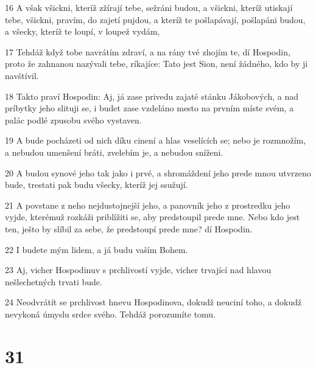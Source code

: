 \par 16 A však všickni, kteríž zžírají tebe, sežráni budou, a všickni, kteríž utiskají tebe, všickni, pravím, do zajetí pujdou, a kteríž te pošlapávají, pošlapáni budou, a všecky, kteríž te loupí, v loupež vydám,
\par 17 Tehdáž když tobe navrátím zdraví, a na rány tvé zhojím te, dí Hospodin, proto že zahnanou nazývali tebe, ríkajíce: Tato jest Sion, není žádného, kdo by ji navštívil.
\par 18 Takto praví Hospodin: Aj, já zase privedu zajaté stánku Jákobových, a nad príbytky jeho slituji se, i budet zase vzdeláno mesto na prvním míste svém, a palác podlé zpusobu svého vystaven.
\par 19 A bude pocházeti od nich díku cinení a hlas veselících se; nebo je rozmnožím, a nebudou umenšení bráti, zvelebím je, a nebudou sníženi.
\par 20 A budou synové jeho tak jako i prvé, a shromáždení jeho prede mnou utvrzeno bude, trestati pak budu všecky, kteríž jej ssužují.
\par 21 A povstane z neho nejdustojnejší jeho, a panovník jeho z prostredku jeho vyjde, kterémuž rozkáži priblížiti se, aby predstoupil prede mne. Nebo kdo jest ten, ješto by slíbil za sebe, že predstoupí prede mne? dí Hospodin.
\par 22 I budete mým lidem, a já budu vaším Bohem.
\par 23 Aj, vicher Hospodinuv s prchlivostí vyjde, vicher trvající nad hlavou nešlechetných trvati bude.
\par 24 Neodvrátít se prchlivost hnevu Hospodinova, dokudž neuciní toho, a dokudž nevykoná úmyslu srdce svého. Tehdáž porozumíte tomu.

\chapter{31}

